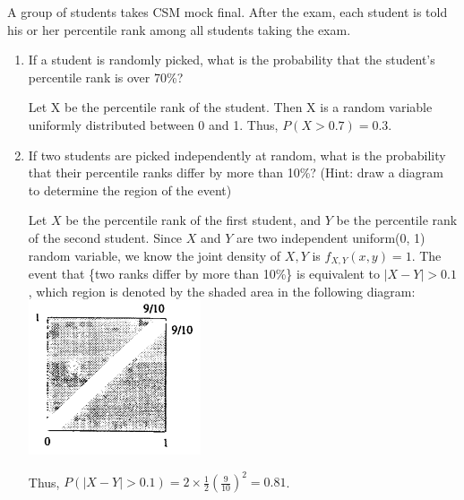 \question A group of students takes CSM mock final. After the exam, each student is told his or her percentile rank among all students taking the exam. 

\begin{enumerate}[label=(\alph*)] 
\item If a student is randomly picked, what is the probability that the student's percentile rank is over 70\%? 
\begin{solution}[4cm] 
Let X be the percentile rank of the student. Then X is a random variable uniformly distributed between 0 and 1. Thus, $P(X > 0.7) = 0.3$. 
\end{solution}

\item If two students are picked independently at random, what is the probability that their percentile ranks differ by more than 10\%? (Hint: draw a diagram to determine the region of the event) 
\begin{solution}[4cm]
Let $X$ be the percentile rank of the first student, and $Y$ be the percentile rank of the second student. Since $X$ and $Y$ are two independent uniform(0, 1) random variable, we know the joint density of $X, Y$ is $f_{X, Y} (x, y) = 1$. The event that \{two ranks differ by more than 10\%\} is equivalent to $|X - Y| > 0.1$, which region is denoted by the shaded area in the following diagram: \\ 

\includegraphics[width=2in]{density.png} 

Thus, $P(|X - Y| > 0.1) = 2 \times \frac{1}{2} (\frac{9}{10})^ 2 = 0.81$. 

\end{solution}
\end{enumerate}
